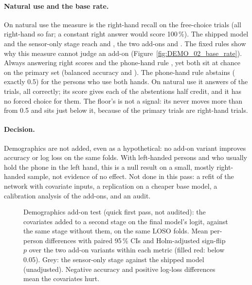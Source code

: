 \paragraph{Natural use and the base rate.} On natural use the measure is the right-hand recall on the free-choice
trials (all right-hand so far; a constant right answer would score 100\,\%). The shipped model and the sensor-only
stage reach  and , the two add-ons 
and . The fixed rules show why this measure cannot judge an add-on
(Figure~\ref{fig:DEMO_02_base_rate}). Always answering right scores  and the
phone-hand rule , yet both sit at chance on the primary set (balanced accuracy
 and ). The phone-hand rule abstains (\pright{} exactly 0.5) for the
 persons who use both hands. On natural use it answers  of
the  trials, all correctly; its score gives each of the  abstentions half
credit, and it has no forced choice for them. The floor's  is not a signal: its
\pright{} never moves more than  from 0.5 and sits just below it, because
 of the primary trials are right-hand trials.

\paragraph{Decision.} Demographics are not added, even as a hypothetical: no add-on variant improves accuracy or
log loss on the same folds. With  left-handed persons and
 who usually hold the phone in the left hand, this is a null result on a small, mostly
right-handed sample, not evidence of no effect. Not done in this pass: a refit of the network with covariate
inputs, a replication on a cheaper base model, a calibration analysis of the add-ons, and an audit.

\begin{figure}[tbp]
\centering
{}
\caption{Demographics add-on test (quick first pass, not audited): the covariates added to a second stage on the
final model's logit, against the same stage without them, on the same LOSO folds. Mean per-person differences with
paired 95\,\% CIs and Holm-adjusted sign-flip $p$ over the two add-on variants within each metric (filled red:
below 0.05). Grey: the sensor-only stage against the shipped model (unadjusted). Negative accuracy and positive
log-loss differences mean the covariates hurt.}
\label{fig:DEMO_01_paired}\label{fig:app:sec-demo-paired}
\end{figure}

